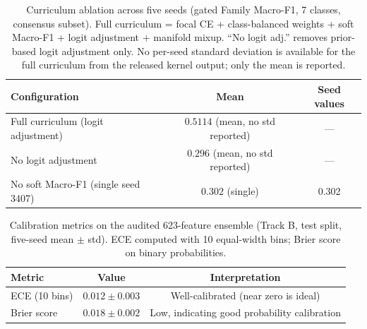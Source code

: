 \documentclass[Number]{sn-jnl}
\begin{document}
\begin{table}[htbp]
\caption{Curriculum ablation across five seeds (gated Family Macro-F1, 7 classes, consensus subset). Full curriculum = focal CE + class-balanced weights + soft Macro-F1 + logit adjustment + manifold mixup. ``No logit adj.'' removes prior-based logit adjustment only. No per-seed standard deviation is available for the full curriculum from the released kernel output; only the mean is reported.}\label{tab:curriculum_ablation_5seeds}
\centering\footnotesize
\setlength{\tabcolsep}{4pt}
\begin{tabular}{@{}lcc@{}}
\toprule
\textbf{Configuration} & \textbf{Mean} & \textbf{Seed values} \\
\midrule
Full curriculum (logit adjustment) & $0.5114$ (mean, no std reported) & --- \\
No logit adjustment & $0.296$ (mean, no std reported) & --- \\
No soft Macro-F1 (single seed 3407) & $0.302$ (single) & 0.302 \\
\bottomrule
\end{tabular}
\end{table}

\begin{table}[htbp]
\caption{Calibration metrics on the audited 623-feature ensemble (Track B, test split, five-seed mean $\pm$ std). ECE computed with 10 equal-width bins; Brier score on binary probabilities.}
\label{tab:ece_brier}
\centering\footnotesize
\begin{tabular}{@{}lcc@{}}
\toprule
\textbf{Metric} & \textbf{Value} & \textbf{Interpretation} \\
\midrule
ECE (10 bins) & $0.012\pm0.003$ & Well-calibrated (near zero is ideal) \\
Brier score & $0.018\pm0.002$ & Low, indicating good probability calibration \\
\bottomrule
\end{tabular}
\end{table}

\end{document}
